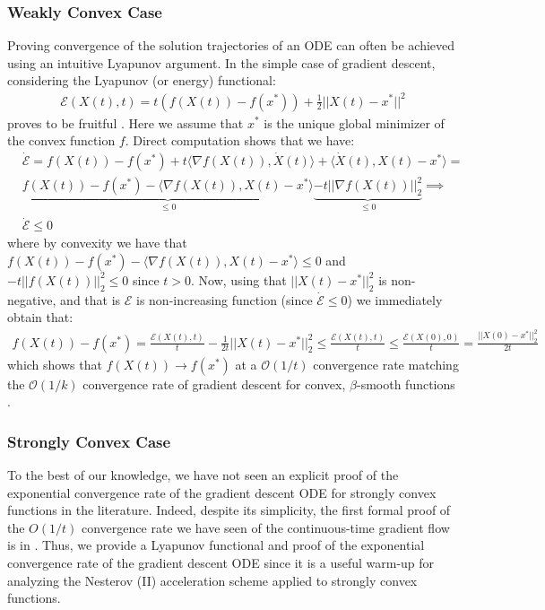 \subsubsection{Weakly Convex Case}
Proving convergence of the solution trajectories of an ODE can often be achieved using an intuitive Lyapunov argument. In the simple case of gradient descent, considering the Lyapunov (or energy) functional:
\begin{align*}
    \mathcal{E}(X(t), t) = t (f(X(t)) - f(x^*)) + \frac{1}{2}||X(t)-x^*||^2
\end{align*}
proves to be fruitful \cite{su2014differential}. Here we assume that $x^*$ is the unique global minimizer of the convex function $f$. Direct computation shows that we have:
\begin{align*}
    & \dot{\mathcal{E}}= f(X(t)) - f(x^*) + t \langle \nabla f(X(t)), \dot{X}(t) \rangle + \langle \dot{X}(t), X(t)-x^* \rangle = \\
    & \underbrace{f(X(t)) - f(x^*) - \langle \nabla f(X(t)), X(t) - x^* \rangle}_{\leq 0} \underbrace{- t || \nabla f(X(t))||_2^2}_{\leq 0} \implies \\
    & \dot{\mathcal{E}} \leq 0
\end{align*}
where by convexity we have that $f(X(t)) - f(x^*) - \langle \nabla f(X(t)), X(t) - x^* \rangle \leq 0$ and $ - t ||f(X(t))||_2^2 \leq 0$ since $t>0$. Now, using that $||X(t)-x^*||_2^2$ is non-negative, and that is $\mathcal{E}$ is non-increasing function (since $\dot{\mathcal{E}} \leq 0$) we immediately obtain that:
\begin{align*}
    f(X(t)) - f(x^*) = \frac{\mathcal{E}(X(t), t)}{t} - \frac{1}{2t} ||X(t) - x^*||_2^2 \leq \frac{\mathcal{E}(X(t), t)}{t} \leq \frac{\mathcal{E}(X(0), 0)}{t} = \frac{||X(0)-x^*||_2^2}{2t}
\end{align*}
which shows that $f(X(t)) \to f(x^*)$ at a $\mathcal{O}(1/t)$ convergence rate matching the $\mathcal{O}(1/k)$ convergence rate of gradient descent for convex, $\beta$-smooth functions \cite{DBLP:journals/ftml/Bubeck15}.

\subsubsection{Strongly Convex Case}
To the best of our knowledge, we have not seen an  explicit proof of the exponential convergence rate of the gradient descent ODE for strongly convex functions in the literature. Indeed, despite its simplicity, the first formal proof of the $O(1/t)$ convergence rate we have seen of the continuous-time gradient flow is in \cite{su2014differential}. Thus, we provide a Lyapunov functional and proof of the exponential convergence rate of the gradient descent ODE since it is a useful warm-up for analyzing the Nesterov (II) acceleration scheme applied to strongly convex functions.

